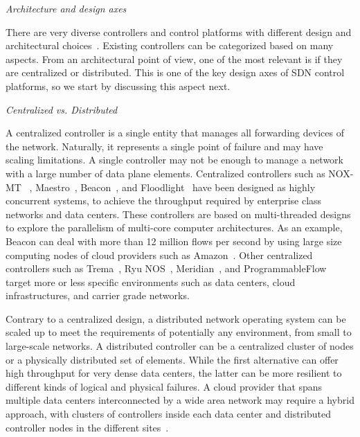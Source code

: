 \vspace{2mm}
\noindent \textit{Architecture and design axes}
\vspace{2mm}

There are very diverse controllers and control platforms with different design and architectural choices~\cite{koponen-1,opendaylight2013,junipernetworks2013-1,hp2013-1,phemius2013,erickson2013-1}.
Existing controllers can be categorized based on many aspects. 
From an architectural point of view, one of the most relevant is if they are centralized or distributed.
This is one of the key design axes of SDN control platforms, so we start by discussing this aspect next. 

\vspace{2mm}
\noindent \textit{Centralized vs. Distributed}

A centralized controller  is a single entity that manages all forwarding devices of the network.
Naturally, it represents a single point of failure and may have scaling limitations.
A single controller may not be enough to manage a network with a large number of data plane elements. 
Centralized controllers such as NOX-MT ~\cite{tootoonchian2012},
Maestro~\cite{cai2011}, Beacon~\cite{erickson2013}, and Floodlight~\cite{openflowhub.org2012}    
have been designed as highly concurrent systems, to achieve the throughput required by enterprise class 
networks and data centers. 
These controllers are based on multi-threaded designs to explore the parallelism of multi-core computer architectures.
As an example, Beacon can deal with more than 12 
million flows per second by using large size computing nodes of cloud providers such as Amazon~\cite{erickson2013}. Other centralized controllers such as Trema~\cite{takamiya2012}, 
Ryu NOS~\cite{nippontelegraphandtelephonecorporation2012}, Meridian~\cite{banikazemi2013}, and 
ProgrammableFlow~\cite{nec2013,nec2013-2} target more or less 
specific environments such as data centers, cloud infrastructures, and carrier grade networks.

Contrary to a centralized design, a distributed network operating system can be scaled up to meet the requirements 
of potentially any environment, from small to large-scale networks.
A distributed controller can be 
a centralized cluster of nodes or a physically distributed set of elements. While the first alternative 
can offer high throughput for very dense data centers, the latter can be more resilient to different 
kinds of logical and physical failures.
A cloud provider that spans multiple data centers interconnected by a wide area network may require a hybrid approach, with clusters of controllers inside each data center and 
distributed controller nodes in the different sites~\cite{jain2013-1}.

